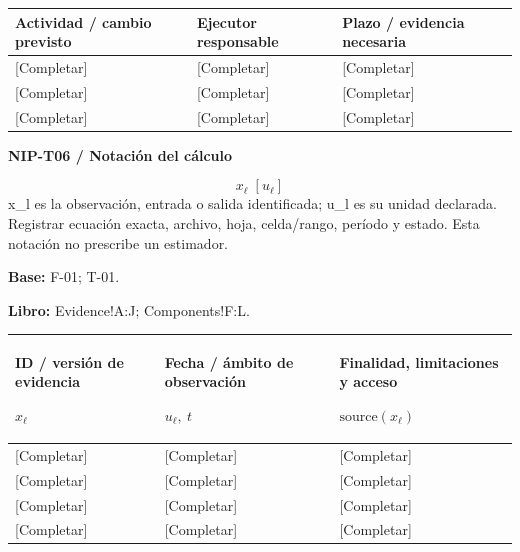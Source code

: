\ProjectMapBox
{}
{\sffamily\fontsize{8.3}{10.3}\selectfont\begin{longtable}{@{}P{70.94mm} P{44.54mm} P{49.49mm}@{}}
\toprule
\textbf{Actividad / cambio previsto} & \textbf{Ejecutor responsable} & \textbf{Plazo / evidencia necesaria}\\\midrule\endhead
\rule{0pt}{7.7mm}[Completar] & [Completar] & [Completar]\\\hline
\rule{0pt}{7.7mm}[Completar] & [Completar] & [Completar]\\\hline
\rule{0pt}{7.7mm}[Completar] & [Completar] & [Completar]\\\hline
\end{longtable}}
\par\begingroup\sffamily\fontsize{8}{10}\selectfont\color{NEBGreen}\setlength{\parskip}{2pt}\setlength{\abovedisplayskip}{4pt}\setlength{\belowdisplayskip}{4pt}\setlength{\abovedisplayshortskip}{2pt}\setlength{\belowdisplayshortskip}{3pt}
\textbf{NIP-T06 / Notación del cálculo}\par
{\fontsize{9}{11}\selectfont\[ x_{\ell}\;[u_{\ell}] \]}
x\_l es la observación, entrada o salida identificada; u\_l es su unidad declarada. Registrar ecuación exacta, archivo, hoja, celda/rango, período y estado. Esta notación no prescribe un estimador.\par
\textbf{Base:} F-01; T-01.\par
\textbf{Libro:} Evidence!A:J; Components!F:L.\par\endgroup
{\sffamily\fontsize{8.3}{10.3}\selectfont\begin{longtable}{@{}P{41.24mm} P{47.84mm} P{75.89mm}@{}}
\toprule
\textbf{ID / versión de evidencia}\par {\normalfont\fontsize{8.2}{10}\selectfont $x_{\ell}$} & \textbf{Fecha / ámbito de observación}\par {\normalfont\fontsize{8.2}{10}\selectfont $u_{\ell},\ t$} & \textbf{Finalidad, limitaciones y acceso}\par {\normalfont\fontsize{8.2}{10}\selectfont $\text{source}(x_{\ell})$}\\\midrule\endhead
\rule{0pt}{7.7mm}[Completar] & [Completar] & [Completar]\\\hline
\rule{0pt}{7.7mm}[Completar] & [Completar] & [Completar]\\\hline
\rule{0pt}{7.7mm}[Completar] & [Completar] & [Completar]\\\hline
\rule{0pt}{7.7mm}[Completar] & [Completar] & [Completar]\\\hline
\end{longtable}}
